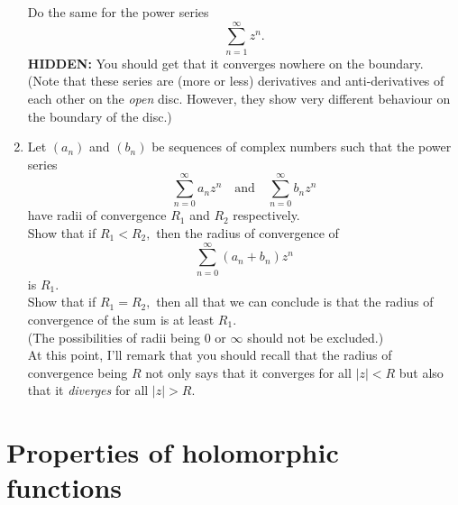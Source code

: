 \documentclass[12pt]{article}
\theoremstyle{definition}
\numberwithin{thm}{section}
\newcommand{\hint}[1]{\textbf{HIDDEN:} {\color[rgb]{0.95, 0.95, 0.95}#1}}
\begin{document}
\begin{enumerate}
	Do the same for the power series
	\begin{equation*} 
		\sum_{n=1}^{\infty}z^n.
	\end{equation*}
	\hint{You should get that it converges nowhere on the boundary.}\\
	(Note that these series are (more or less) derivatives and anti-derivatives of each other on the \emph{open} disc. However, they show very different behaviour on the boundary of the disc.)
	\item Let $(a_n)$ and $(b_n)$ be sequences of complex numbers such that the power series
	\begin{equation*} 
		\sum_{n=0}^{\infty}a_nz^n \quad \text{and} \quad \sum_{n=0}^{\infty}b_nz^n
	\end{equation*}
	have radii of convergence $R_1$ and $R_2$ respectively.\\
	Show that if $R_1 < R_2,$ then the radius of convergence of
	\begin{equation*} 
		\sum_{n=0}^{\infty}(a_n + b_n)z^n
	\end{equation*}
	is $R_1.$\\
	Show that if $R_1 = R_2,$ then all that we can conclude is that the radius of convergence of the sum is at least $R_1.$\\
	(The possibilities of radii being $0$ or $\infty$ should not be excluded.)\\
	At this point, I'll remark that you should recall that the radius of convergence being $R$ not only says that it converges for all $|z| < R$ but also that it \emph{diverges} for all $|z| > R.$
\end{enumerate}
\newpage\section{Properties of holomorphic functions}
\end{document}
